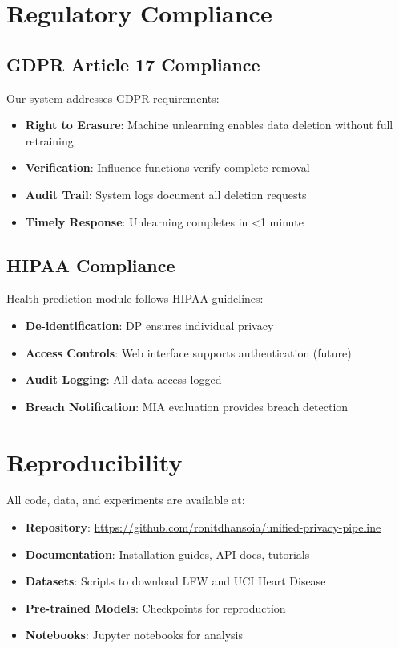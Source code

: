 \documentclass[conference]{IEEEtran}
\begin{document}
\section{Regulatory Compliance}

\subsection{GDPR Article 17 Compliance}

Our system addresses GDPR requirements:

\begin{itemize}
    \item \textbf{Right to Erasure}: Machine unlearning enables data deletion without full retraining
    \item \textbf{Verification}: Influence functions verify complete removal
    \item \textbf{Audit Trail}: System logs document all deletion requests
    \item \textbf{Timely Response}: Unlearning completes in <1 minute
\end{itemize}

\subsection{HIPAA Compliance}

Health prediction module follows HIPAA guidelines:

\begin{itemize}
    \item \textbf{De-identification}: DP ensures individual privacy
    \item \textbf{Access Controls}: Web interface supports authentication (future)
    \item \textbf{Audit Logging}: All data access logged
    \item \textbf{Breach Notification}: MIA evaluation provides breach detection
\end{itemize}

\section{Reproducibility}

All code, data, and experiments are available at:

\begin{itemize}
    \item \textbf{Repository}: \url{https://github.com/ronitdhansoia/unified-privacy-pipeline}
    \item \textbf{Documentation}: Installation guides, API docs, tutorials
    \item \textbf{Datasets}: Scripts to download LFW and UCI Heart Disease
    \item \textbf{Pre-trained Models}: Checkpoints for reproduction
    \item \textbf{Notebooks}: Jupyter notebooks for analysis
\end{itemize}
\end{document}
